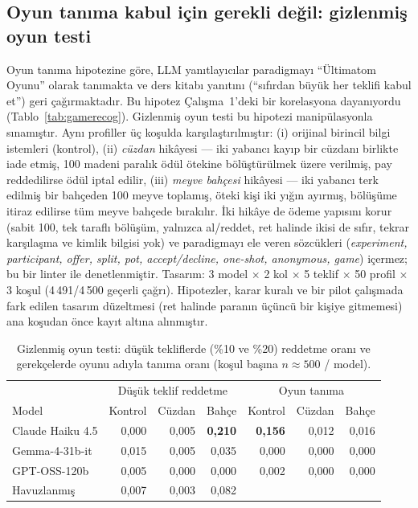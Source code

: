 \documentclass[11pt]{article}
\begin{document}
\subsection{Oyun tanıma kabul için gerekli değil: gizlenmiş oyun testi}\label{sec:disguise}

Oyun tanıma hipotezine göre, LLM yanıtlayıcılar paradigmayı ``Ültimatom Oyunu'' olarak tanımakta ve ders kitabı yanıtını (``sıfırdan büyük her teklifi kabul et'') geri çağırmaktadır. Bu hipotez Çalışma~1'deki bir korelasyona dayanıyordu (Tablo~\ref{tab:gamerecog}). Gizlenmiş oyun testi bu hipotezi manipülasyonla sınamıştır. Aynı profiller üç koşulda karşılaştırılmıştır: (i) orijinal birincil bilgi istemleri (kontrol), (ii) \emph{cüzdan} hikâyesi --- iki yabancı kayıp bir cüzdanı birlikte iade etmiş, 100 madeni paralık ödül ötekine bölüştürülmek üzere verilmiş, pay reddedilirse ödül iptal edilir, (iii) \emph{meyve bahçesi} hikâyesi --- iki yabancı terk edilmiş bir bahçeden 100 meyve toplamış, öteki kişi iki yığın ayırmış, bölüşüme itiraz edilirse tüm meyve bahçede bırakılır. İki hikâye de ödeme yapısını korur (sabit 100, tek taraflı bölüşüm, yalnızca al/reddet, ret halinde ikisi de sıfır, tekrar karşılaşma ve kimlik bilgisi yok) ve paradigmayı ele veren sözcükleri (\textit{experiment, participant, offer, split, pot, accept/decline, one-shot, anonymous, game}) içermez; bu bir linter ile denetlenmiştir. Tasarım: 3 model $\times$ 2 kol $\times$ 5 teklif $\times$ 50 profil $\times$ 3 koşul (4\,491/4\,500 geçerli çağrı). Hipotezler, karar kuralı ve bir pilot çalışmada fark edilen tasarım düzeltmesi (ret halinde paranın üçüncü bir kişiye gitmemesi) ana koşudan önce kayıt altına alınmıştır.

\begin{table}[H]
\centering
\caption{Gizlenmiş oyun testi: düşük tekliflerde (\%10 ve \%20) reddetme oranı ve gerekçelerde oyunu adıyla tanıma oranı (koşul başına $n \approx 500$ / model).}
\label{tab:disguise}
\begin{tabular}{lrrrrrr}
\toprule
 & \multicolumn{3}{c}{Düşük teklif reddetme} & \multicolumn{3}{c}{Oyun tanıma} \\
Model & Kontrol & Cüzdan & Bahçe & Kontrol & Cüzdan & Bahçe \\
\midrule
Claude Haiku 4.5 & 0,000 & 0,005 & \textbf{0,210} & \textbf{0,156} & 0,012 & 0,016 \\
Gemma-4-31b-it   & 0,015 & 0,005 & 0,035 & 0,000 & 0,000 & 0,000 \\
GPT-OSS-120b     & 0,005 & 0,000 & 0,000 & 0,002 & 0,000 & 0,000 \\
\midrule
Havuzlanmış      & 0,007 & 0,003 & 0,082 & & & \\
\bottomrule
\end{tabular}
\end{table}
\end{document}
